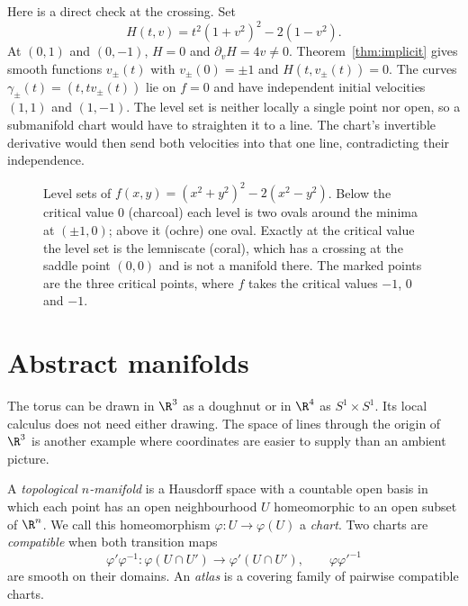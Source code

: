 Here is a direct check at the crossing. Set
\[
H(t,v)=t^2(1+v^2)^2-2(1-v^2).
\]
At $(0,1)$ and $(0,-1)$, $H=0$ and $\partial_vH=4v\ne0$.
Theorem~\ref{thm:implicit} gives smooth functions $v_\pm(t)$ with
$v_\pm(0)=\pm1$ and $H(t,v_\pm(t))=0$.
The curves $\gamma_\pm(t)=(t,tv_\pm(t))$ lie on $f=0$ and have
independent initial velocities $(1,1)$ and $(1,-1)$. The level set is
neither locally a single point nor open, so a submanifold chart would
have to straighten it to a line. The chart's invertible derivative
would then send both velocities into that one line, contradicting
their independence.

\begin{figure}[ht]
\centering
{}
\caption{Level sets of $f(x,y)=(x^2+y^2)^2-2(x^2-y^2)$. Below the critical value $0$ (charcoal) each level is two ovals around the minima at $(\pm1,0)$; above
it (ochre) one oval. Exactly at the critical value the level set is the lemniscate (coral), which has a crossing at the saddle point $(0,0)$ and is not
a manifold there. The marked points are the three critical points, where $f$ takes the critical values $-1$, $0$ and $-1$.}
\label{fig:cassini}
\end{figure}

\section{Abstract manifolds}\label{sec:abstract}

The torus can be drawn in $\R^3$ as a doughnut or in $\R^4$ as $S^1\times S^1$. Its local calculus does not need either drawing. The space of lines through the origin of $\R^3$ is another example where coordinates are easier to supply than an ambient picture.

\begin{definition}
A \emph{topological $n$-manifold} is a Hausdorff space with a countable open basis in which each point has an open neighbourhood $U$ homeomorphic to an open subset of $\R^n$. We call this homeomorphism $\varphi:U\to\varphi(U)$ a \emph{chart}. Two charts are \emph{compatible} when both transition maps
\[
\varphi'\varphi^{-1}:\varphi(U\cap U')\to\varphi'(U\cap U'),\qquad
\varphi\varphi'^{-1}
\]
are smooth on their domains. An \emph{atlas} is a covering family of pairwise compatible charts.
\end{definition}

